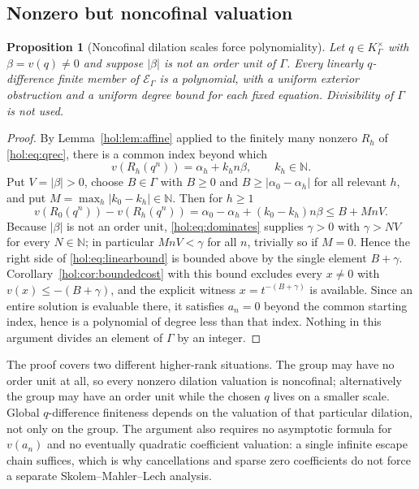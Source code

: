\documentclass[11pt]{article}
\numberwithin{equation}{section}
\newtheorem{proposition}[theorem]{Proposition}
\theoremstyle{definition}
\theoremstyle{remark}
\newcommand{\N}{\mathbb N}
\newcommand{\K}{K_\Gamma}
\newcommand{\E}{\mathcal E_\Gamma}
\newcommand{\abs}[1]{\lvert#1\rvert}
\begin{document}
\subsection{Nonzero but noncofinal valuation}

\begin{proposition}[Noncofinal dilation scales force polynomiality]
\label{hol:prop:noncofinal}
Let $q\in\K^\times$ with $\beta=v(q)\ne0$ and suppose $\abs\beta$ is not an
order unit of $\Gamma$. Every linearly $q$-difference finite member of $\E$ is
a polynomial, with a uniform exterior obstruction and a uniform degree bound
for each fixed equation. Divisibility of $\Gamma$ is not used.
\end{proposition}

\begin{proof}
By Lemma~\ref{hol:lem:affine} applied to the finitely many nonzero $R_h$ of
\eqref{hol:eq:qrec}, there is a common index beyond which
\[
 v(R_h(q^n))=\alpha_h+k_hn\beta,\qquad k_h\in\N.
\]
Put $V=\abs\beta>0$, choose $B\in\Gamma$ with $B\ge0$ and
$B\ge\abs{\alpha_0-\alpha_h}$ for all relevant $h$, and put
$M=\max_h\abs{k_0-k_h}\in\N$. Then for $h\ge1$
\begin{equation}\label{hol:eq:linearbound}
 v(R_0(q^n))-v(R_h(q^n))=\alpha_0-\alpha_h+(k_0-k_h)n\beta\le B+MnV.
\end{equation}
Because $\abs\beta$ is not an order unit, \eqref{hol:eq:dominates} supplies
$\gamma>0$ with $\gamma>NV$ for every $N\in\N$; in particular $MnV<\gamma$ for
all $n$, trivially so if $M=0$. Hence the right side of
\eqref{hol:eq:linearbound} is bounded above by the single element $B+\gamma$.
Corollary~\ref{hol:cor:boundedcost} with this bound excludes every $x\ne0$
with $v(x)\le-(B+\gamma)$, and the explicit witness $x=t^{-(B+\gamma)}$ is
available. Since an entire solution is evaluable there, it satisfies $a_n=0$
beyond the common starting index, hence is a polynomial of degree less than
that index. Nothing in this argument divides an element of $\Gamma$ by an
integer.
\end{proof}

The proof covers two different higher-rank situations. The group may have no
order unit at all, so every nonzero dilation valuation is noncofinal;
alternatively the group may have an order unit while the chosen $q$ lives on a
smaller scale. Global $q$-difference finiteness depends on the valuation of
that particular dilation, not only on the group. The argument also requires no
asymptotic formula for $v(a_n)$ and no eventually quadratic coefficient
valuation: a single infinite escape chain suffices, which is why cancellations
and sparse zero coefficients do not force a separate Skolem--Mahler--Lech
analysis.
\end{document}
